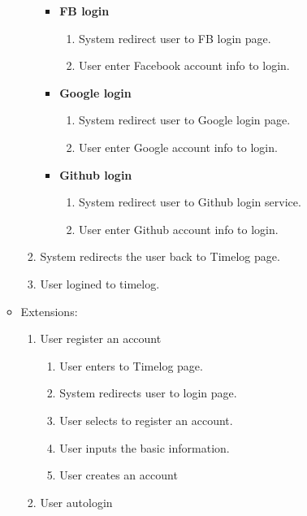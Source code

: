 \documentclass[12pt, a4paper]{article}
\begin{document}
\begin{CJK*}{UTF8}{bkai}
\begin{enumerate}
\begin{itemize}
\begin{enumerate}
\begin{itemize}
                  \item {\bf FB login}
                    \begin{enumerate}
                      \item System redirect user to FB login page.
                      \item User enter Facebook account info to login.
                    \end{enumerate}
                  \item {\bf Google login}
                    \begin{enumerate}
                      \item System redirect user to Google login page.
                      \item User enter Google account info to login.
                    \end{enumerate}
                  \item {\bf Github login}
                    \begin{enumerate}
                      \item System redirect user to Github login service.
                      \item User enter Github account info to login.
                    \end{enumerate}
                \end{itemize}
              \item System redirects the user back to Timelog page.
              \item User logined to timelog.
            \end{enumerate}
          \item Extensions:
            \begin{enumerate}
              \item User register an account
              \begin{enumerate}
                \item User enters to Timelog page.
                \item System redirects user to login page.
                \item User selects to register an account.
                \item User inputs the basic information.
                \item User creates an account
              \end{enumerate}
              \item User autologin

\end{enumerate}
\end{itemize}
\end{enumerate}
\end{CJK*}
\end{document}
